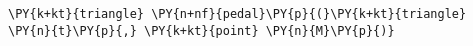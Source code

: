 \begin{Verbatim}[commandchars=\\\{\}]
    \PY{k+kt}{triangle} \PY{n+nf}{pedal}\PY{p}{(}\PY{k+kt}{triangle} \PY{n}{t}\PY{p}{,} \PY{k+kt}{point} \PY{n}{M}\PY{p}{)}
\end{Verbatim}

